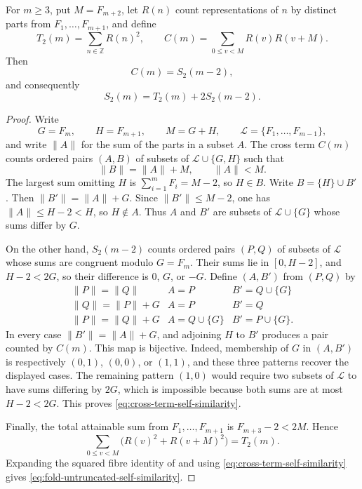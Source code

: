 \begin{proposition}
\label{prop:exact-fold-pairing-self-similarity}
For \(m\ge3\), put \(M=F_{m+2}\), let \(R(n)\) count representations of
\(n\) by distinct parts from \(F_1,\ldots,F_{m+1}\), and define
\[
 T_2(m)=\sum_{n\in\mathbb Z}R(n)^2,
 \qquad
 C(m)=\sum_{0\le v<M}R(v)R(v+M).
\]
Then
\begin{equation}\label{eq:cross-term-self-similarity}
 C(m)=S_2(m-2),
\end{equation}
and consequently
\begin{equation}\label{eq:fold-untruncated-self-similarity}
 S_2(m)=T_2(m)+2S_2(m-2).
\end{equation}
\end{proposition}
\begin{proof}
Write
\[
 G=F_m,\qquad H=F_{m+1},\qquad M=G+H,\qquad
 \mathcal L=\{F_1,\ldots,F_{m-1}\},
\]
and write \(\|A\|\) for the sum of the parts in a subset \(A\).
The cross term \(C(m)\) counts ordered pairs \((A,B)\) of subsets of
\(\mathcal L\cup\{G,H\}\) such that
\[
 \|B\|=\|A\|+M,\qquad \|A\|<M.
\]
The largest sum omitting \(H\) is
\(\sum_{i=1}^{m}F_i=M-2\), so \(H\in B\).  Write
\(B=\{H\}\cup B'\).  Then
\(\|B'\|=\|A\|+G\).  Since \(\|B'\|\le M-2\), one has
\(\|A\|\le H-2<H\), so \(H\notin A\).  Thus \(A\) and \(B'\) are subsets of
\(\mathcal L\cup\{G\}\) whose sums differ by \(G\).

On the other hand, \(S_2(m-2)\) counts ordered pairs \((P,Q)\) of subsets of
\(\mathcal L\) whose sums are congruent modulo \(G=F_m\).  Their sums lie in
\([0,H-2]\), and \(H-2<2G\), so their difference is \(0\), \(G\), or \(-G\).
Define \((A,B')\) from \((P,Q)\) by
\[
\begin{array}{c|c|c}
 \|P\|=\|Q\| & A=P & B'=Q\cup\{G\}\\
 \|Q\|=\|P\|+G & A=P & B'=Q\\
 \|P\|=\|Q\|+G & A=Q\cup\{G\} & B'=P\cup\{G\}.
\end{array}
\]
In every case \(\|B'\|=\|A\|+G\), and adjoining \(H\) to \(B'\) produces a
pair counted by \(C(m)\).  This map is bijective.  Indeed, membership of \(G\)
in \((A,B')\) is respectively \((0,1)\), \((0,0)\), or \((1,1)\), and these
three patterns recover the displayed cases.  The remaining pattern \((1,0)\)
would require two subsets of \(\mathcal L\) to have sums differing by \(2G\),
which is impossible because both sums are at most \(H-2<2G\).  This proves
\eqref{eq:cross-term-self-similarity}.

Finally, the total attainable sum from \(F_1,\ldots,F_{m+1}\) is
\(F_{m+3}-2<2M\).  Hence
\[
 \sum_{0\le v<M}\bigl(R(v)^2+R(v+M)^2\bigr)=T_2(m).
\]
Expanding the squared fibre identity of
 and using
\eqref{eq:cross-term-self-similarity} gives
\eqref{eq:fold-untruncated-self-similarity}.
\end{proof}

